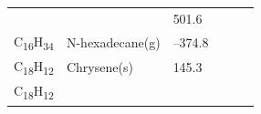 \documentclass[
  9pt,
]{extbook}
\theoremstyle{definition}
\theoremstyle{definition}
\theoremstyle{definition}
\theoremstyle{remark}
\begin{document}
\begin{longtable}[]{@{}llllll@{}}
\begin{minipage}[t]{0.15\columnwidth}
\strut
\end{minipage} & \begin{minipage}[t]{0.14\columnwidth}\raggedright
\strut
\end{minipage} & \begin{minipage}[t]{0.14\columnwidth}\raggedright
501.6\strut
\end{minipage}\tabularnewline
\begin{minipage}[t]{0.07\columnwidth}\raggedright
C\textsubscript{16}H\textsubscript{34}\strut
\end{minipage} & \begin{minipage}[t]{0.17\columnwidth}\raggedright
N-hexadecane(g)\strut
\end{minipage} & \begin{minipage}[t]{0.15\columnwidth}\raggedright
--374.8\strut
\end{minipage} & \begin{minipage}[t]{0.15\columnwidth}\raggedright
\strut
\end{minipage} & \begin{minipage}[t]{0.14\columnwidth}\raggedright
\strut
\end{minipage} & \begin{minipage}[t]{0.14\columnwidth}\raggedright
\strut
\end{minipage}\tabularnewline
\begin{minipage}[t]{0.07\columnwidth}\raggedright
C\textsubscript{18}H\textsubscript{12}\strut
\end{minipage} & \begin{minipage}[t]{0.17\columnwidth}\raggedright
Chrysene(s)\strut
\end{minipage} & \begin{minipage}[t]{0.15\columnwidth}\raggedright
145.3\strut
\end{minipage} & \begin{minipage}[t]{0.15\columnwidth}\raggedright
\strut
\end{minipage} & \begin{minipage}[t]{0.14\columnwidth}\raggedright
\strut
\end{minipage} & \begin{minipage}[t]{0.14\columnwidth}\raggedright
\strut
\end{minipage}\tabularnewline
\begin{minipage}[t]{0.07\columnwidth}\raggedright
C\textsubscript{18}H\textsubscript{12}\strut
\end{minipage} & \begin{minipage}[t]{0.17\columnwidth}\raggedright

\end{minipage}
\end{longtable}
\end{document}
